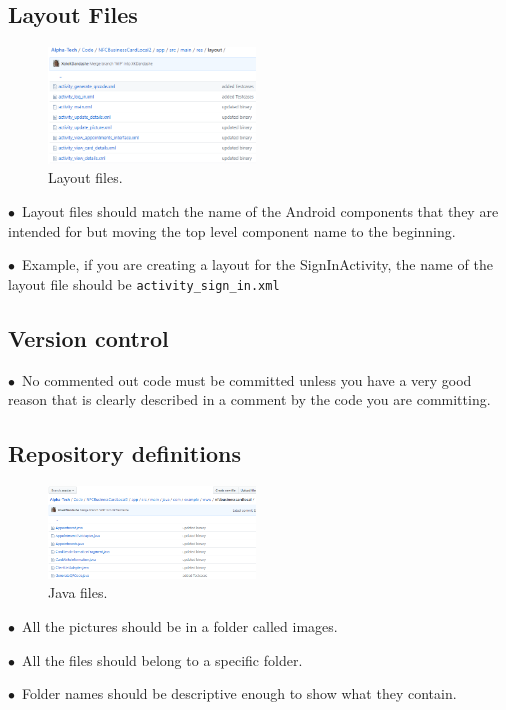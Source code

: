 \documentclass[english]{article}
\begin{document}
\subsection{Layout Files}
\begin{figure}
	\caption{Layout files.}
	\label{wrap-fig:5}
	\includegraphics[width=5.5cm]{images/layouts.png}
\end{figure} 
$\bullet$\ Layout files should match the name of the Android components that they are intended for but moving the top level component name to the beginning. \par
$\bullet$\ Example, if you are creating a layout for the SignInActivity, the name of the layout file should be \texttt{activity\_sign\_in.xml} \par



\subsection{Version control}
$\bullet$\ No commented out code must be committed unless you have a very good reason that is clearly described in a comment by the code you are committing. \par


\subsection{Repository definitions}
\begin{figure}
	\caption{Java files.}
	\label{wrap-fig:6}
	\includegraphics[width=5.5cm]{images/javafiles.png}
\end{figure} 
$\bullet$\ All the pictures should be in a folder called images. \par
$\bullet$\ All the files should belong to a specific folder. \par
$\bullet$\ Folder names should be descriptive enough to show what they contain. \par
\end{document}
